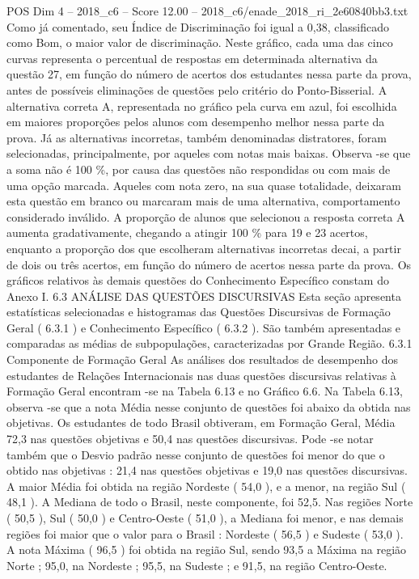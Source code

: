 \begin{textsample}{POS Dim 4 – 2018\_c6 – Score 12.00 – 2018\_c6/enade\_2018\_ri\_2e60840bb3.txt}
Como já comentado, seu Índice de Discriminação foi igual a 0,38, classificado como Bom, o maior valor de discriminação.
Neste gráfico, cada uma das cinco curvas representa o percentual de respostas em determinada alternativa da questão 27, em função do número de acertos dos estudantes nessa parte da prova, antes de possíveis eliminações de questões pelo critério do Ponto-Bisserial.
A alternativa correta A, representada no gráfico pela curva em azul, foi escolhida em maiores proporções pelos alunos com desempenho melhor nessa parte da prova.
Já as alternativas incorretas, também denominadas distratores, foram selecionadas, principalmente, por aqueles com notas mais baixas.
Observa -se que a soma não é 100 \%, por causa das questões não respondidas ou com mais de uma opção marcada.
Aqueles com nota zero, na sua quase totalidade, deixaram esta questão em branco ou marcaram mais de uma alternativa, comportamento considerado inválido.
A proporção de alunos que selecionou a resposta correta A aumenta gradativamente, chegando a atingir 100 \% para 19 e 23 acertos, enquanto a proporção dos que escolheram alternativas incorretas decai, a partir de dois ou três acertos, em função do número de acertos nessa parte da prova.
Os gráficos relativos às demais questões do Conhecimento Específico constam do Anexo I. 6.3 ANÁLISE DAS QUESTÕES DISCURSIVAS Esta seção apresenta estatísticas selecionadas e histogramas das Questões Discursivas de Formação Geral ( 6.3.1 ) e Conhecimento Específico ( 6.3.2 ).
São também apresentadas e comparadas as médias de subpopulações, caracterizadas por Grande Região. 6.3.1 Componente de Formação Geral As análises dos resultados de desempenho dos estudantes de Relações Internacionais nas duas questões discursivas relativas à Formação Geral encontram -se na Tabela 6.13 e no Gráfico 6.6.
Na Tabela 6.13, observa -se que a nota Média nesse conjunto de questões foi abaixo da obtida nas objetivas.
Os estudantes de todo Brasil obtiveram, em Formação Geral, Média 72,3 nas questões objetivas e 50,4 nas questões discursivas.
Pode -se notar também que o Desvio padrão nesse conjunto de questões foi menor do que o obtido nas objetivas : 21,4 nas questões objetivas e 19,0 nas questões discursivas.
A maior Média foi obtida na região Nordeste ( 54,0 ), e a menor, na região Sul ( 48,1 ).
A Mediana de todo o Brasil, neste componente, foi 52,5.
Nas regiões Norte ( 50,5 ), Sul ( 50,0 ) e Centro-Oeste ( 51,0 ), a Mediana foi menor, e nas demais regiões foi maior que o valor para o Brasil : Nordeste ( 56,5 ) e Sudeste ( 53,0 ).
A nota Máxima ( 96,5 ) foi obtida na região Sul, sendo 93,5 a Máxima na região Norte ; 95,0, na Nordeste ; 95,5, na Sudeste ; e 91,5, na região Centro-Oeste.

\end{textsample}
